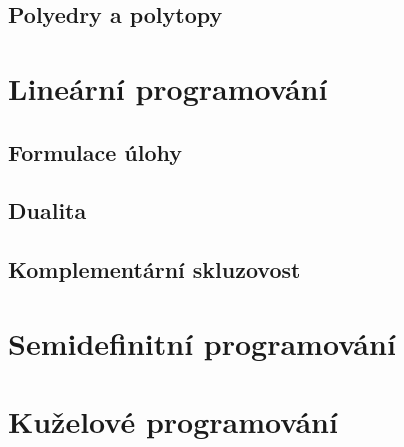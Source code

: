 \section{Polyedry a polytopy}


\chapter{Lineární programování}

\section{Formulace úlohy}

\section{Dualita}

\section{Komplementární skluzovost}

\chapter{Semidefinitní programování}

\chapter{Kuželové programování}
